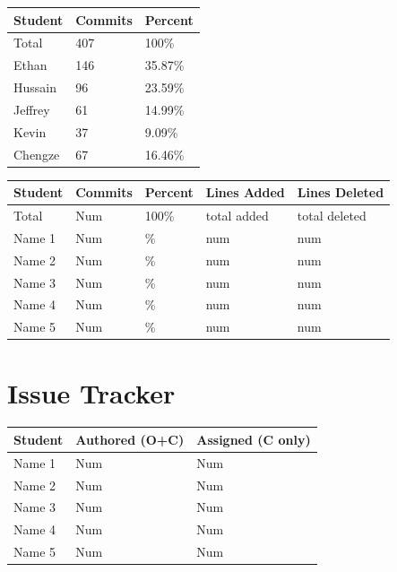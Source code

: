 \documentclass{article}
\begin{document}
\begin{table}[H]
\centering
\begin{tabular}{lll}
\toprule
\textbf{Student} & \textbf{Commits} & \textbf{Percent}\\
\midrule
Total & 407 & 100\% \\
Ethan & 146 & 35.87\% \\
Hussain & 96 & 23.59\% \\
Jeffrey & 61 & 14.99\% \\
Kevin & 37 & 9.09\% \\
Chengze & 67 & 16.46\% \\
\bottomrule
\end{tabular}
\end{table}

\begin{table}[H]
\centering
\begin{tabular}{lllll}
\toprule
\textbf{Student} & \textbf{Commits} & \textbf{Percent} & \textbf{Lines Added} &
\textbf{Lines Deleted}\\
\midrule
Total & Num & 100\% & total added & total deleted\\
Name 1 & Num & \% & num & num\\
Name 2 & Num & \% & num & num\\
Name 3 & Num & \% & num & num\\
Name 4 & Num & \% & num & num\\
Name 5 & Num & \% & num & num\\
\bottomrule
\end{tabular}
\end{table}

\section{Issue Tracker}


\begin{table}[H]
\centering
\begin{tabular}{lll}
\toprule
\textbf{Student} & \textbf{Authored (O+C)} & \textbf{Assigned (C only)}\\
\midrule
Name 1 & Num & Num \\
Name 2 & Num & Num \\
Name 3 & Num & Num \\
Name 4 & Num & Num \\
Name 5 & Num & Num \\
\bottomrule
\end{tabular}
\end{table}
\end{document}
